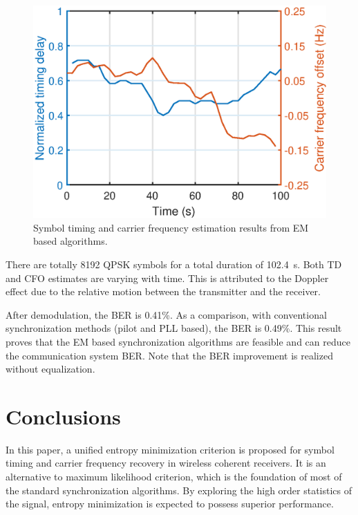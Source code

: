 \documentclass[journal,comsoc,onecolumn, 12pt,draftclsnofoot]{IEEEtran}
\begin{document}
\begin{figure}[ht]
\centering
\includegraphics[width=3 in]{pic/per_exp.eps}
\caption{Symbol timing and carrier frequency estimation results from EM based algorithms.}
\label{fig:per_exp} 
\end{figure} 

There are totally 8192 QPSK symbols for a total duration of 102.4~s.
Both TD and CFO estimates are varying with time.
This is attributed to the Doppler effect due to the relative motion between the transmitter and the receiver.

After demodulation, the BER is 0.41\%.
As a comparison, with conventional synchronization methods (pilot and PLL based), the BER is 0.49\%.
This result proves that the EM based synchronization algorithms are feasible and can reduce the communication system BER.
Note that the BER improvement is realized without equalization.  


\section{Conclusions}
\label{sec:conc}
In this paper, a unified entropy minimization criterion is proposed for symbol timing and carrier frequency recovery in wireless coherent receivers.
It is an alternative to maximum likelihood criterion, which is the foundation of most of the standard synchronization algorithms. 
By exploring the high order statistics of the signal, entropy minimization is expected to possess superior performance. 
\end{document}
